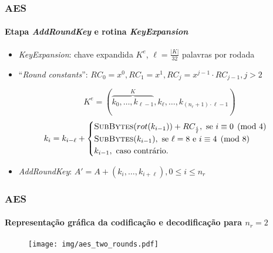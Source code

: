 \documentclass[12pt]{beamer}
\newcommand{\length}[1]{\vert #1 \vert}
\begin{document}
\begin{frame}
    \frametitle{AES}
    \framesubtitle{Etapa \emph{AddRoundKey} e rotina \emph{KeyExpansion}}
          \begin{itemize}
            \item \emph{KeyExpansion}: chave expandida $K^e$, $\ell = \frac{\length{K}}{32}$ palavras por rodada
            \item ``\emph{Round constants}'':
                $RC_0 = x^0, RC_1 = x^1, RC_j = x^{j-1} \cdot RC_{j-1}, j > 2$
        
                $$K^e = (\overbrace{k_0, \dots, k_{\ell - 1}}^{K}, k_{\ell}, \dots, k_{(n_r + 1) \cdot \ell - 1})$$
                \begin{equation*}
  k_i = k_{i - \ell} + 
    \begin{cases}
      \textsc{SubBytes}(rot(k_{i - 1})) + RC_{\frac{i}{\ell}},
        \text{ se } i \equiv 0 \pmod{4} \\
      \textsc{SubBytes}(k_{i - 1}),
        \text{ se } \ell = 8 \text { e } i \equiv 4 \pmod{8} \\
      k_{i - 1}, \text{ caso contrário.}
    \end{cases}
\end{equation*}
        \item \emph{AddRoundKey}: $A' = A + (k_{i}, \dots, k_{i + \ell}), 0 \leq i \leq n_r$
          \end{itemize}
\end{frame}

\begin{frame}
    \frametitle{AES}
    \framesubtitle{Representação gráfica da codificação e decodificação para $n_r = 2$}
    \begin{figure}
        \centering
        \texttt{[image: img/aes\_two\_rounds.pdf]}
        \label{fig:my_label}
    \end{figure}
\end{frame}
\end{document}

